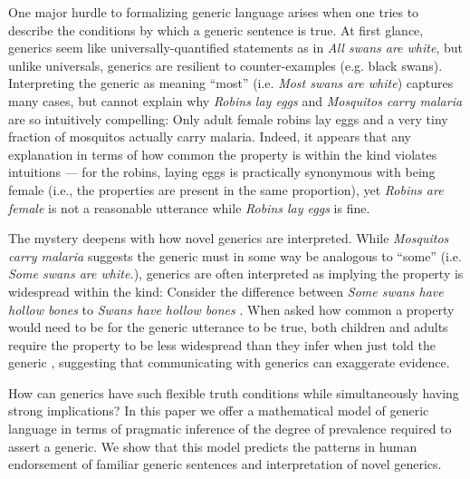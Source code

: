 \documentclass{pnastwo}
\begin{document}
\begin{article}
One major hurdle to formalizing generic language arises when one tries to describe the conditions by which a generic sentence is true.
At first glance, generics seem like universally-quantified statements as in \emph{All swans are white}, but unlike universals, generics are resilient to counter-examples (e.g. black swans). 
Interpreting the generic as meaning ``most'' (i.e. \emph{Most swans are white}) captures many cases, but cannot explain why \emph{Robins lay eggs} and \emph{Mosquitos carry malaria} are so intuitively compelling: Only adult female robins lay eggs and a very tiny fraction of mosquitos actually carry malaria.
Indeed, it appears that any explanation in terms of how common the property is within the kind violates intuitions --- for the robins, laying eggs is practically synonymous with being female (i.e., the properties are present in the same proportion), yet \emph{Robins are female} is not a reasonable utterance while \emph{Robins lay eggs} is fine.


The mystery deepens with how novel generics are interpreted.
While \emph{Mosquitos carry malaria} suggests the generic must in some way be analogous to ``some'' (i.e. \emph{Some swans are white.}), generics are often interpreted as implying the property is widespread within the kind:
Consider the difference between \emph{Some swans have hollow bones} to \emph{Swans have hollow bones} \cite{Gelman2002}.
When asked how common a property would need to be for the generic utterance to be true, both children and adults require the property to be less widespread than they infer when just told the generic \cite{Cimpian2010,Brandone2014}, suggesting that communicating with generics can exaggerate evidence.

How can generics have such flexible truth conditions while simultaneously having strong implications?
In this paper we offer a mathematical model of generic language in terms of pragmatic inference of the degree of prevalence required to assert a generic.  
We show that this model predicts the patterns in human endorsement of familiar generic sentences and interpretation of novel generics. 


\end{article}
\end{document}
